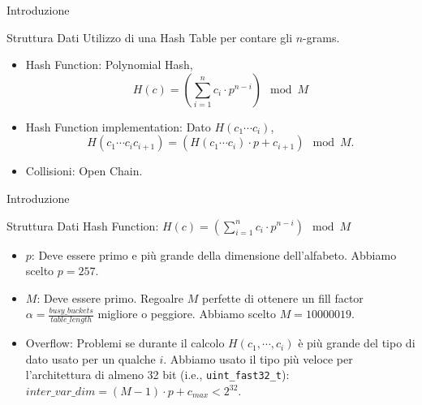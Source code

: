 \begin{frame}{Introduzione}
    \begin{block}{Struttura Dati}
        Utilizzo di una Hash Table per contare gli $n$-grams.
        \begin{itemize}
            \item Hash Function: Polynomial Hash,
                \begin{equation*}
                    H(c)=\left(\sum_{i=1}^n c_i\cdot p^{n-i}\right) \mod M
                \end{equation*}
            \item Hash Function implementation: Dato $H(c_1\cdots c_i)$,
                \begin{equation*}
                    H(c_1\cdots c_ic_{i+1})=(H(c_1\cdots c_i)\cdot p+c_{i+1}) \mod M.
                \end{equation*}
            \item Collisioni: Open Chain.
        \end{itemize}
    \end{block}
\end{frame}

\begin{frame}{Introduzione}
    \begin{block}{Struttura Dati}
        Hash Function: $\displaystyle H(c)=\left(\sum_{i=1}^n c_i\cdot p^{n-i}\right) \mod M$
        \begin{itemize}
            \item $p$: Deve essere primo e più grande della dimensione dell'alfabeto. Abbiamo scelto $p=257$.
            \item $M$: Deve essere primo. Regoalre $M$ perfette di ottenere un fill factor $\alpha=\tfrac{busy\_buckets}{table\_length}$ migliore o peggiore. Abbiamo scelto $M=10000019$.
            \item Overflow: Problemi se durante il calcolo $H(c_1,\cdots,c_i)$ è più grande del tipo di dato usato per un qualche $i$. Abbiamo usato il tipo più veloce per l'architettura di almeno 32 bit (i.e., \texttt{uint\_fast32\_t}): $inter\_var\_dim=(M-1)\cdot p+c_{max}<2^{32}$.
        \end{itemize}
    \end{block}
\end{frame}
